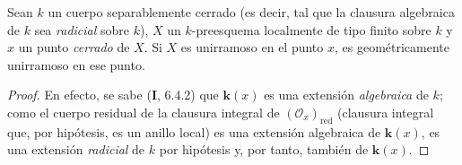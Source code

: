 \begin{lemma}[6.15.8]
\label{IV.2.s6.15.8-fr}
Sean $k$ un cuerpo separablemente cerrado \textup{(es decir, tal
que la clausura algebraica de $k$ sea \emph{radicial} sobre $k$)},
$X$ un $k$-preesquema localmente de tipo finito sobre $k$ y
$x$ un punto \emph{cerrado} de $X$. Si $X$ es unirramoso en el punto
$x$, es geométricamente unirramoso en ese punto.
\end{lemma}

\begin{proof}
En efecto, se sabe (\textbf I, 6.4.2) que $\boldsymbol{k}(x)$ es una extensión
\emph{algebraica} de $k$; como el cuerpo residual de la clausura
integral de $(\mathcal O_x)_{\mathrm{red}}$ (clausura
integral que, por hipótesis, es un anillo local) es una
extensión algebraica de $\boldsymbol{k}(x)$, es una extensión \emph{radicial}
de $k$ por hipótesis y, por tanto, también de $\boldsymbol{k}(x)$.
\end{proof}
